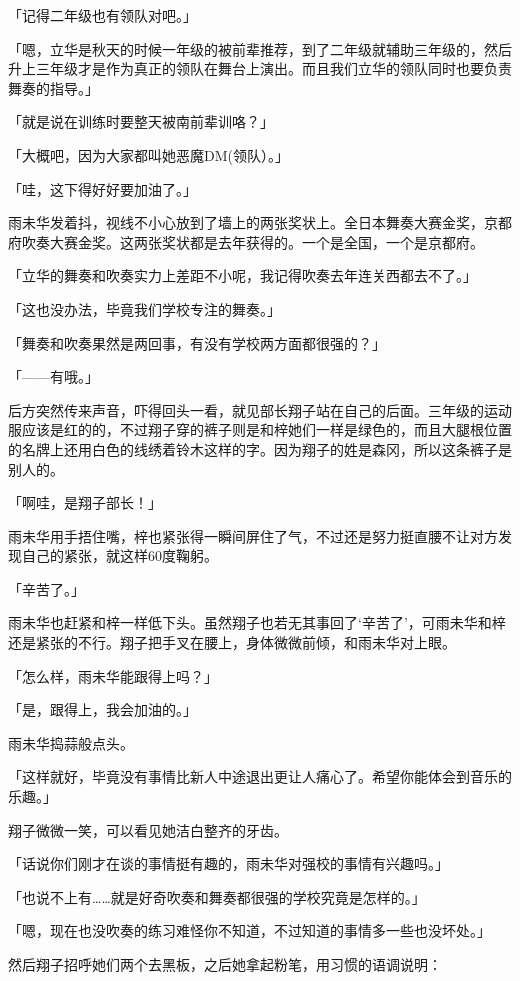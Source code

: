 \documentclass[UTF8]{ctexart}
\begin{document}
    「记得二年级也有领队对吧。」

    「嗯，立华是秋天的时候一年级的被前辈推荐，到了二年级就辅助三年级的，然后升上三年级才是作为真正的领队在舞台上演出。而且我们立华的领队同时也要负责舞奏的指导。」

    「就是说在训练时要整天被南前辈训咯？」

    「大概吧，因为大家都叫她恶魔DM(领队）。」

    「哇，这下得好好要加油了。」

    雨未华发着抖，视线不小心放到了墙上的两张奖状上。全日本舞奏大赛金奖，京都府吹奏大赛金奖。这两张奖状都是去年获得的。一个是全国，一个是京都府。

    「立华的舞奏和吹奏实力上差距不小呢，我记得吹奏去年连关西都去不了。」

    「这也没办法，毕竟我们学校专注的舞奏。」

    「舞奏和吹奏果然是两回事，有没有学校两方面都很强的？」

    「——有哦。」

    后方突然传来声音，吓得回头一看，就见部长翔子站在自己的后面。三年级的运动服应该是红的的，不过翔子穿的裤子则是和梓她们一样是绿色的，而且大腿根位置的名牌上还用白色的线绣着铃木这样的字。因为翔子的姓是森冈，所以这条裤子是别人的。

    「啊哇，是翔子部长！」

    雨未华用手捂住嘴，梓也紧张得一瞬间屏住了气，不过还是努力挺直腰不让对方发现自己的紧张，就这样60度鞠躬。

    「辛苦了。」

    雨未华也赶紧和梓一样低下头。虽然翔子也若无其事回了‘辛苦了’，可雨未华和梓还是紧张的不行。翔子把手叉在腰上，身体微微前倾，和雨未华对上眼。

    「怎么样，雨未华能跟得上吗？」

    「是，跟得上，我会加油的。」

    雨未华捣蒜般点头。

    「这样就好，毕竟没有事情比新人中途退出更让人痛心了。希望你能体会到音乐的乐趣。」

    翔子微微一笑，可以看见她洁白整齐的牙齿。

    「话说你们刚才在谈的事情挺有趣的，雨未华对强校的事情有兴趣吗。」

    「也说不上有……就是好奇吹奏和舞奏都很强的学校究竟是怎样的。」

    「嗯，现在也没吹奏的练习难怪你不知道，不过知道的事情多一些也没坏处。」

    然后翔子招呼她们两个去黑板，之后她拿起粉笔，用习惯的语调说明：
\end{document}
